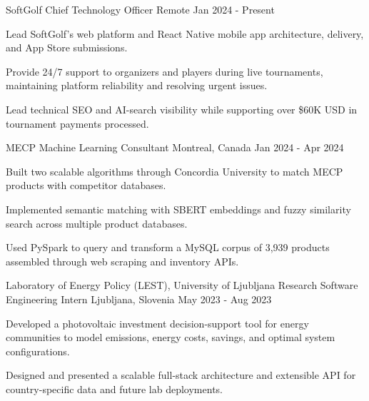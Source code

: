 \begin{cventries}
  \cventry
    {SoftGolf} %
    {Chief Technology Officer} %
    {Remote} %
    {Jan 2024 - Present} %
    {
      \begin{cvitems} %
        \item {Lead SoftGolf's web platform and React Native mobile app architecture, delivery, and App Store submissions.}
        \item {Provide 24/7 support to organizers and players during live tournaments, maintaining platform reliability and resolving urgent issues.}
        \item {Lead technical SEO and AI-search visibility while supporting over \$60K USD in tournament payments processed.}
      \end{cvitems}
    }

  \cventry
    {MECP} %
    {Machine Learning Consultant} %
    {Montreal, Canada} %
    {Jan 2024 - Apr 2024} %
    {
      \begin{cvitems} %
        \item {Built two scalable algorithms through Concordia University to match MECP products with competitor databases.}
        \item {Implemented semantic matching with SBERT embeddings and fuzzy similarity search across multiple product databases.}
        \item {Used PySpark to query and transform a MySQL corpus of 3,939 products assembled through web scraping and inventory APIs.}
      \end{cvitems}
    }

  \cventry
    {Laboratory of Energy Policy (LEST), University of Ljubljana} %
    {Research Software Engineering Intern} %
    {Ljubljana, Slovenia} %
    {May 2023 - Aug 2023} %
    {
      \begin{cvitems} %
        \item {Developed a photovoltaic investment decision-support tool for energy communities to model emissions, energy costs, savings, and optimal system configurations.}
        \item {Designed and presented a scalable full-stack architecture and extensible API for country-specific data and future lab deployments.}
      \end{cvitems}
    }


\end{cventries}
